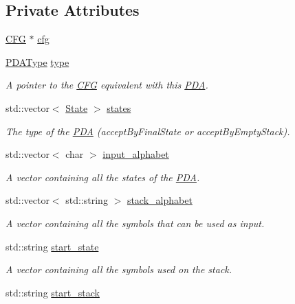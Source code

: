 \subsection*{Private Attributes}
\begin{DoxyCompactItemize}
\item 
\hyperlink{classCFG}{C\-F\-G} $\ast$ \hyperlink{classPDA_1_1PDA_aef026ff20ec36b368db8cf05dc7d6ef7}{cfg}
\item 
\hyperlink{namespacePDA_a2f2b17cdf30facf6f0fe593ab209acf8}{P\-D\-A\-Type} \hyperlink{classPDA_1_1PDA_a15524b46d2be399f384b0f236ccb38f4}{type}
\begin{DoxyCompactList}\small\item\em A pointer to the \hyperlink{classCFG}{C\-F\-G} equivalent with this \hyperlink{classPDA_1_1PDA}{P\-D\-A}. \end{DoxyCompactList}\item 
std\-::vector$<$ \hyperlink{classPDA_1_1State}{State} $>$ \hyperlink{classPDA_1_1PDA_a38d40f2c938f18d396ea2b13ca361271}{states}
\begin{DoxyCompactList}\small\item\em The type of the \hyperlink{classPDA_1_1PDA}{P\-D\-A} (accept\-By\-Final\-State or accept\-By\-Empty\-Stack). \end{DoxyCompactList}\item 
std\-::vector$<$ char $>$ \hyperlink{classPDA_1_1PDA_a54db260eece0bfe0d5aad0ef13f18a02}{input\-\_\-alphabet}
\begin{DoxyCompactList}\small\item\em A vector containing all the states of the \hyperlink{classPDA_1_1PDA}{P\-D\-A}. \end{DoxyCompactList}\item 
std\-::vector$<$ std\-::string $>$ \hyperlink{classPDA_1_1PDA_a90a4f96e28003d5bfa4d67b4c7a191b5}{stack\-\_\-alphabet}
\begin{DoxyCompactList}\small\item\em A vector containing all the symbols that can be used as input. \end{DoxyCompactList}\item 
std\-::string \hyperlink{classPDA_1_1PDA_af346efb9a6812d704d69299eef9262e6}{start\-\_\-state}
\begin{DoxyCompactList}\small\item\em A vector containing all the symbols used on the stack. \end{DoxyCompactList}\item 
std\-::string \hyperlink{classPDA_1_1PDA_a253c02338c616cd8e8882f71e2a5666f}{start\-\_\-stack}

\end{DoxyCompactItemize}
